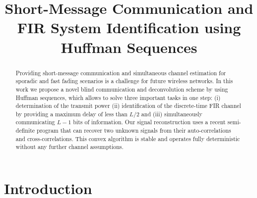 \documentclass[conference]{IEEEtran}
\begin{document}
%
%
\title{Short-Message Communication and FIR System Identification using Huffman Sequences}


\author{
} 



\maketitle
%
%
\begin{abstract} %
  Providing short-message communication and simultaneous channel estimation for sporadic and fast fading scenarios is a
  challenge for future wireless networks.  In this work we propose a novel blind communication and deconvolution scheme by using Huffman
  sequences, which allows to solve three important tasks in one step: (i) determination of the transmit power (ii)
  identification of the discrete-time FIR channel by providing a maximum delay of less than $L/2$ and (iii)
  simultaneously communicating $L-1$ bits of information.  Our signal reconstruction uses a recent semi-definite program
  that can recover two unknown signals from their auto-correlations and cross-correlations.  This convex algorithm is
  stable and operates fully deterministic without any further channel assumptions.
\end{abstract}


\section{Introduction}
\end{document}
